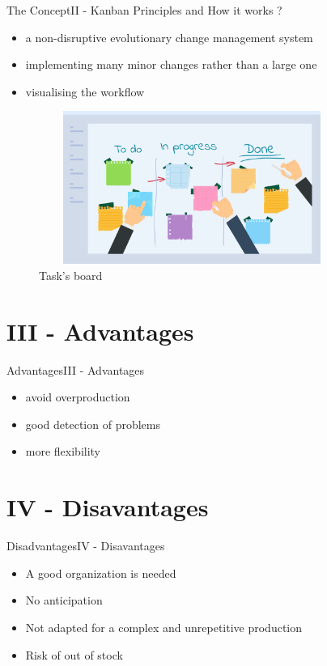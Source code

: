 \documentclass[10pt]{beamer}
\newcommand{\PII}{II - Kanban Principles and How it works ?}
\newcommand{\PIII}{III - Advantages}
\newcommand{\PIV}{IV - Disavantages}
\begin{document}
\begin{frame}{The Concept}{\PII}
    \begin{itemize}
        \item a non-disruptive evolutionary change management system
        \item implementing many minor changes rather than a large one
        \item visualising the workflow
    \end{itemize}
     \begin{figure}
      \centering
   \includegraphics[width=10cm, height=5cm]{ph.png}
      \caption{Task's board}
     \end{figure}
\end{frame}

\section{\PIII} 
\begin{frame}{Advantages}{\PIII}
    \begin{itemize}
        \item avoid overproduction
        \item good detection of problems
        \item more flexibility 
    \end{itemize}

\end{frame}

\section{\PIV} 
\begin{frame}{Disadvantages}{\PIV}
    \begin{itemize}
        \item A good organization is needed
        \item No anticipation
        \item Not adapted for a complex and unrepetitive production
        \item Risk of out of stock
    \end{itemize}
\end{frame}
\end{document}
